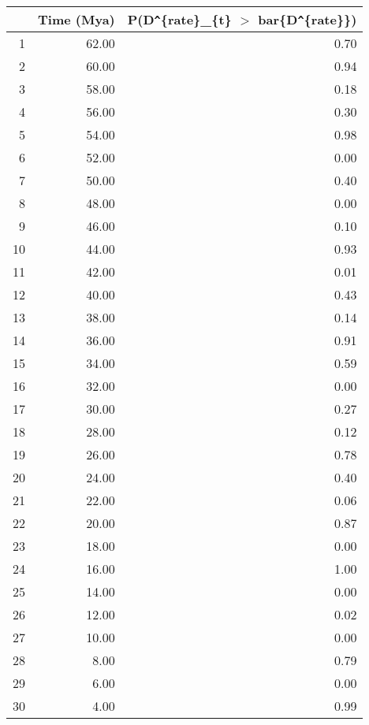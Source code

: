 \begin{table}[ht]
\centering
\begin{tabular}{rrr}
  \hline
 & Time (Mya) & P(D\verb|^|\{rate\}\_\{t\} $>$ bar\{D\verb|^|\{rate\}\}) \\ 
  \hline
1 & 62.00 & 0.70 \\ 
  2 & 60.00 & 0.94 \\ 
  3 & 58.00 & 0.18 \\ 
  4 & 56.00 & 0.30 \\ 
  5 & 54.00 & 0.98 \\ 
  6 & 52.00 & 0.00 \\ 
  7 & 50.00 & 0.40 \\ 
  8 & 48.00 & 0.00 \\ 
  9 & 46.00 & 0.10 \\ 
  10 & 44.00 & 0.93 \\ 
  11 & 42.00 & 0.01 \\ 
  12 & 40.00 & 0.43 \\ 
  13 & 38.00 & 0.14 \\ 
  14 & 36.00 & 0.91 \\ 
  15 & 34.00 & 0.59 \\ 
  16 & 32.00 & 0.00 \\ 
  17 & 30.00 & 0.27 \\ 
  18 & 28.00 & 0.12 \\ 
  19 & 26.00 & 0.78 \\ 
  20 & 24.00 & 0.40 \\ 
  21 & 22.00 & 0.06 \\ 
  22 & 20.00 & 0.87 \\ 
  23 & 18.00 & 0.00 \\ 
  24 & 16.00 & 1.00 \\ 
  25 & 14.00 & 0.00 \\ 
  26 & 12.00 & 0.02 \\ 
  27 & 10.00 & 0.00 \\ 
  28 & 8.00 & 0.79 \\ 
  29 & 6.00 & 0.00 \\ 
  30 & 4.00 & 0.99 \\ 
   \hline
\end{tabular}
\label{tab:rate_peak}
\end{table}

